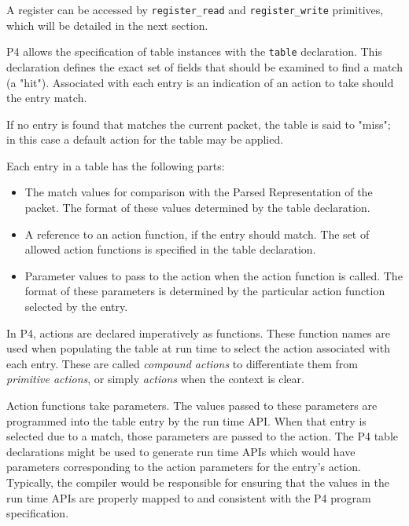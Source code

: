 \documentclass[12pt]{article}
\begin{document}
{\color{red}
A register can be accessed by \texttt{register_read} and 
\texttt{register_write} primitives, which will be detailed in the 
next section.
}


P4 allows the specification of table instances with the \texttt{table}
declaration. This declaration defines the exact set of fields that
should be examined to find a match (a "hit").  Associated with each
entry is an indication of an action to take should the entry match.

If no entry is found that matches the current packet, the table is said to 
"miss"; in this case a default action for the table may be applied.

Each entry in a \matchaction table has the following parts: 

\begin{itemize}
\item
The match values for comparison with the Parsed Representation of the packet. 
The format of these values determined by the table declaration.
\item
A reference to an action function, if the entry should match. The set
of allowed action functions is specified in the table declaration.
\item
Parameter values to pass to the action when the action function is called. 
The format of these parameters is determined by the particular action function 
selected by the entry.
\end{itemize}


In P4, actions are declared imperatively as functions. These function
names are used when populating the table at run time to select the
action associated with each entry. These are called \textit{compound
actions} to differentiate them from \textit{primitive actions}, or
simply \textit{actions} when the context is clear.

Action functions take parameters. The values passed to these
parameters are programmed into the table entry by the run time
API. When that entry is selected due to a match, those parameters are
passed to the action. The P4 table declarations might be used to
generate run time APIs which would have parameters corresponding to
the action parameters for the entry's action.  Typically, the compiler
would be responsible for ensuring that the values in the run time APIs
are properly mapped to and consistent with the P4 program
specification.
\end{document}
